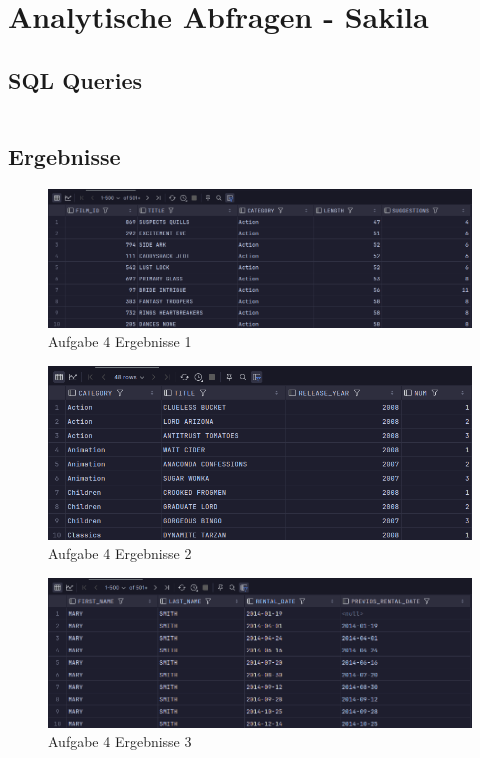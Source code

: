 \documentclass[12pt]{scrartcl}
\begin{document}
\pagebreak

\section{Analytische Abfragen - Sakila}

\subsection{SQL Queries}

\inputminted{sql}{../ue3_4.sql}

\subsection{Ergebnisse}

\begin{figure}[H]
	\centering
	\includegraphics[width=1\linewidth]{../ue3_4_1.png}
	\caption{Aufgabe 4 Ergebnisse 1}
\end{figure}

\begin{figure}[H]
	\centering
	\includegraphics[width=1\linewidth]{../ue3_4_2.png}
	\caption{Aufgabe 4 Ergebnisse 2}
\end{figure}

\begin{figure}[H]
	\centering
	\includegraphics[width=1\linewidth]{../ue3_4_3a.png}
	\caption{Aufgabe 4 Ergebnisse 3}
\end{figure}
\end{document}
